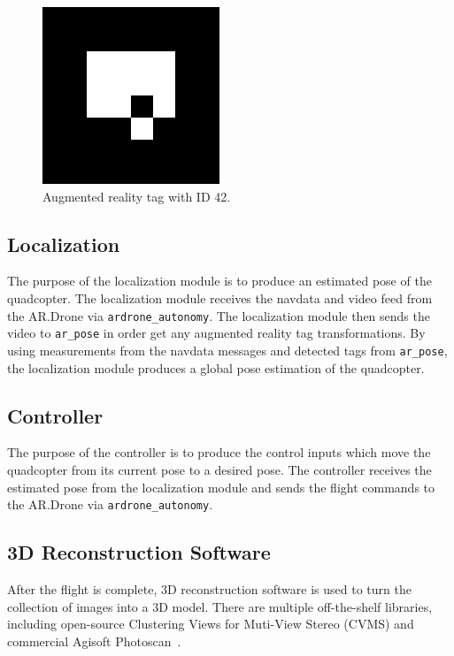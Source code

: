         \begin{figure}[ht]
                \centering
        		\includegraphics[width=200px]{../images/artag.png}
                \caption{Augmented reality tag with ID 42.}\label{fig:artag}
        \end{figure}


    \subsection{Localization}
        The purpose of the localization module is to produce an estimated pose of the quadcopter. The localization module receives the navdata and video feed from the AR.Drone via \texttt{ardrone\_autonomy}. The localization module then sends the video to \texttt{ar\_pose} in order get any augmented reality tag transformations. By using measurements from the navdata messages and detected tags from \texttt{ar\_pose}, the localization module produces a global pose estimation of the quadcopter.

    \subsection{Controller}
        The purpose of the controller is to produce the control inputs which move the quadcopter from its current pose to a desired pose. The controller receives the estimated pose from the localization module and sends the flight commands to the AR.Drone via \texttt{ardrone\_autonomy}.

    \subsection{3D Reconstruction Software}
        After the flight is complete, 3D reconstruction software is used to turn the collection of images into a 3D model. There are multiple off-the-shelf libraries, including open-source Clustering Views for Muti-View Stereo (CVMS) and commercial Agisoft Photoscan~\cite{CMVS, Agisoft}. 

